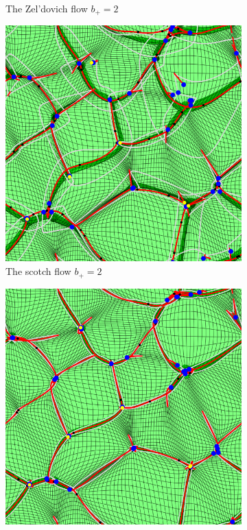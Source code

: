 \documentclass[a4paper, 11pt]{article}
\begin{document}
\begin{figure}
\begin{subfigure}[b]{0.32\textwidth}
\caption{The Zel'dovich flow $b_+=2$}
\end{subfigure}
\begin{subfigure}[b]{0.32\textwidth}
\includegraphics[width=\textwidth]{Visual_Scotch_D=2}
\caption{The scotch flow $b_+=2$}
\end{subfigure}
\begin{subfigure}[b]{0.32\textwidth}
\includegraphics[width=\textwidth]{Visual_Nbody_D=2}

\end{subfigure}
\end{figure}
\end{document}
